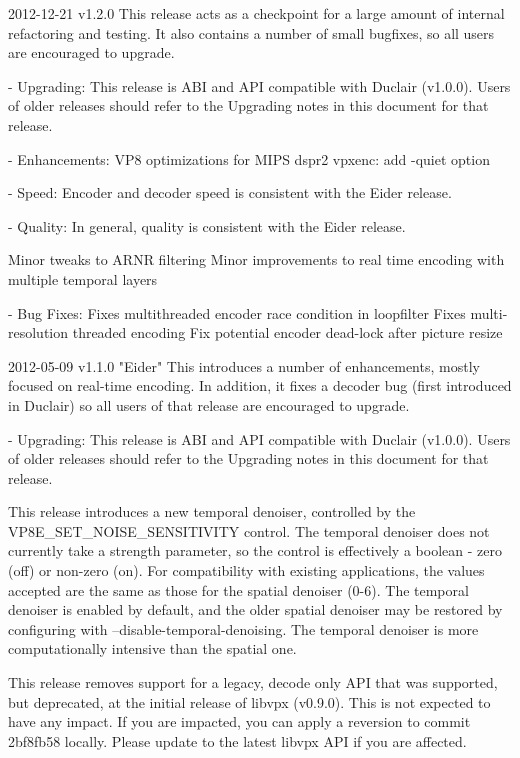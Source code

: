 
\begin{DoxyVerbInclude}
2012-12-21 v1.2.0
  This release acts as a checkpoint for a large amount of internal refactoring
  and testing. It also contains a number of small bugfixes, so all users are
  encouraged to upgrade.

  - Upgrading:
    This release is ABI and API compatible with Duclair (v1.0.0). Users
    of older releases should refer to the Upgrading notes in this
    document for that release.

  - Enhancements:
      VP8 optimizations for MIPS dspr2
      vpxenc: add -quiet option

  - Speed:
      Encoder and decoder speed is consistent with the Eider release.

  - Quality:
      In general, quality is consistent with the Eider release.

      Minor tweaks to ARNR filtering
      Minor improvements to real time encoding with multiple temporal layers

  - Bug Fixes:
      Fixes multithreaded encoder race condition in loopfilter
      Fixes multi-resolution threaded encoding
      Fix potential encoder dead-lock after picture resize


2012-05-09 v1.1.0 "Eider"
  This introduces a number of enhancements, mostly focused on real-time
  encoding. In addition, it fixes a decoder bug (first introduced in
  Duclair) so all users of that release are encouraged to upgrade.

  - Upgrading:
    This release is ABI and API compatible with Duclair (v1.0.0). Users
    of older releases should refer to the Upgrading notes in this
    document for that release.

    This release introduces a new temporal denoiser, controlled by the
    VP8E_SET_NOISE_SENSITIVITY control. The temporal denoiser does not
    currently take a strength parameter, so the control is effectively
    a boolean - zero (off) or non-zero (on). For compatibility with
    existing applications, the values accepted are the same as those
    for the spatial denoiser (0-6). The temporal denoiser is enabled
    by default, and the older spatial denoiser may be restored by
    configuring with --disable-temporal-denoising. The temporal denoiser
    is more computationally intensive than the spatial one.

    This release removes support for a legacy, decode only API that was
    supported, but deprecated, at the initial release of libvpx
    (v0.9.0). This is not expected to have any impact. If you are
    impacted, you can apply a reversion to commit 2bf8fb58 locally.
    Please update to the latest libvpx API if you are affected.


\end{DoxyVerbInclude}
